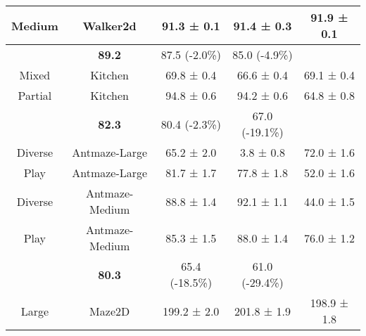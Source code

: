 \begin{table}[h]
{\begin{tabular}{cc|ccc}
    \cellcolor[HTML]{FFFFFF}Medium        & \cellcolor[HTML]{FFFFFF}Walker2d       & \cellcolor[HTML]{FFFFFF}91.3 ± 0.1  & \cellcolor[HTML]{FFFFFF}91.4 ± 0.3  & 91.9 ± 0.1       \\ \hline
    \rowcolor[HTML]{E7E6E6} 
    \multicolumn{2}{c|}{\cellcolor[HTML]{E7E6E6}\textbf{Performance}}              & \textbf{89.2}                       & 87.5 (-2.0\%)                                & 85.0 (-4.9\%)            \\ \hline
    \cellcolor[HTML]{FFFFFF}Mixed         & \cellcolor[HTML]{FFFFFF}Kitchen        & 69.8 ± 0.4                          & \cellcolor[HTML]{FFFFFF}66.6 ± 0.4  & 69.1 ± 0.4       \\ \hline
    \cellcolor[HTML]{FFFFFF}Partial       & \cellcolor[HTML]{FFFFFF}Kitchen        & 94.8 ± 0.6                          & \cellcolor[HTML]{FFFFFF}94.2 ± 0.6  & 64.8 ± 0.8       \\ \hline
    \rowcolor[HTML]{E7E6E6} 
    \multicolumn{2}{c|}{\cellcolor[HTML]{E7E6E6}\textbf{Performance}}              & \textbf{82.3}                       & 80.4 (-2.3\%)                                & 67.0 (-19.1\%)            \\ \hline
    \cellcolor[HTML]{FFFFFF}Diverse       & \cellcolor[HTML]{FFFFFF}Antmaze-Large  & 65.2 ± 2.0                          & \cellcolor[HTML]{FFFFFF}3.8 ± 0.8   & 72.0 ± 1.6       \\ \hline
    \cellcolor[HTML]{FFFFFF}Play          & \cellcolor[HTML]{FFFFFF}Antmaze-Large  & 81.7 ± 1.7                          & \cellcolor[HTML]{FFFFFF}77.8 ± 1.8  & 52.0 ± 1.6       \\ \hline
    \cellcolor[HTML]{FFFFFF}Diverse       & \cellcolor[HTML]{FFFFFF}Antmaze-Medium & 88.8 ± 1.4                          & \cellcolor[HTML]{FFFFFF}92.1 ± 1.1  & 44.0 ± 1.5       \\ \hline
    \cellcolor[HTML]{FFFFFF}Play          & \cellcolor[HTML]{FFFFFF}Antmaze-Medium & 85.3 ± 1.5                          & \cellcolor[HTML]{FFFFFF}88.0 ± 1.4  & 76.0 ± 1.2       \\ \hline
    \rowcolor[HTML]{E7E6E6} 
    \multicolumn{2}{c|}{\cellcolor[HTML]{E7E6E6}\textbf{Performance}}              & \textbf{80.3}                       & 65.4 (-18.5\%)                               & 61.0 (-29.4\%)            \\ \hline
    \cellcolor[HTML]{FFFFFF}Large         & \cellcolor[HTML]{FFFFFF}Maze2D         & 199.2 ± 2.0                         & \cellcolor[HTML]{FFFFFF}201.8 ± 1.9 & 198.9 ± 1.8      \\ \hline

\end{tabular}}
\end{table}
